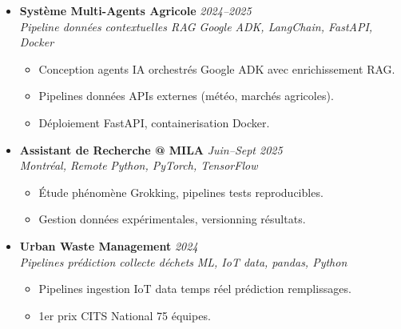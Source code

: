 \documentclass[a4paper,11pt]{article}
\begin{document}
\begin{itemize}[leftmargin=0.5cm, nosep]
    \item \textbf{Syst\`eme Multi-Agents Agricole} \hfill \textit{2024--2025} \\
    \textit{Pipeline donn\'ees contextuelles RAG} \hfill \textit{Google ADK, LangChain, FastAPI, Docker}
    \vspace{-2pt}
    \begin{itemize}[leftmargin=0.4cm, nosep, label=\tiny$\bullet$]
        \item \small{Conception agents IA orchestr\'es Google ADK avec enrichissement RAG.}
        \item \small{Pipelines donn\'ees APIs externes (m\'et\'eo, march\'es agricoles).}
        \item \small{D\'eploiement FastAPI, containerisation Docker.}
    \end{itemize}
    \vspace{3pt}

    \item \textbf{Assistant de Recherche @ MILA} \hfill \textit{Juin--Sept 2025} \\
    \textit{Montr\'eal, Remote} \hfill \textit{Python, PyTorch, TensorFlow}
    \vspace{-2pt}
    \begin{itemize}[leftmargin=0.4cm, nosep, label=\tiny$\bullet$]
        \item \small{\'Etude ph\'enom\`ene Grokking, pipelines tests reproducibles.}
        \item \small{Gestion donn\'ees exp\'erimentales, versionning r\'esultats.}
    \end{itemize}
    \vspace{3pt}

    \item \textbf{Urban Waste Management} \hfill \textit{2024} \\
    \textit{Pipelines pr\'ediction collecte d\'echets} \hfill \textit{ML, IoT data, pandas, Python}
    \vspace{-2pt}
    \begin{itemize}[leftmargin=0.4cm, nosep, label=\tiny$\bullet$]
        \item \small{Pipelines ingestion IoT data temps r\'eel pr\'ediction remplissages.}
        \item \small{1er prix CITS National 75 \'equipes.}
    \end{itemize}
    \vspace{3pt}


\end{itemize}
\end{document}

